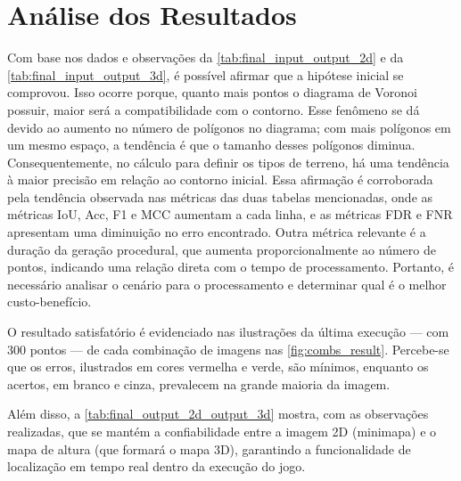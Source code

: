 \section{Análise dos Resultados}

Com base nos dados e observações da \cref{tab:final_input_output_2d} e da \cref{tab:final_input_output_3d}, é possível afirmar que a hipótese inicial se comprovou. Isso ocorre porque, quanto mais pontos o diagrama de Voronoi possuir, maior será a compatibilidade com o contorno. Esse fenômeno se dá devido ao aumento no número de polígonos no diagrama; com mais polígonos em um mesmo espaço, a tendência é que o tamanho desses polígonos diminua. Consequentemente, no cálculo para definir os tipos de terreno, há uma tendência à maior precisão em relação ao contorno inicial. Essa afirmação é corroborada pela tendência observada nas métricas das duas tabelas mencionadas, onde as métricas IoU, Acc, F1 e MCC aumentam a cada linha, e as métricas FDR e FNR apresentam uma diminuição no erro encontrado. Outra métrica relevante é a duração da geração procedural, que aumenta proporcionalmente ao número de pontos, indicando uma relação direta com o tempo de processamento. Portanto, é necessário analisar o cenário para o processamento e determinar qual é o melhor custo-benefício.

O resultado satisfatório é evidenciado nas ilustrações da última execução — com 300 pontos — de cada combinação de imagens nas \cref{fig:combs_result}. Percebe-se que os erros, ilustrados em cores vermelha e verde, são mínimos, enquanto os acertos, em branco e cinza, prevalecem na grande maioria da imagem.

Além disso, a \cref{tab:final_output_2d_output_3d} mostra, com as observações realizadas, que se mantém a confiabilidade entre a imagem 2D (minimapa) e o mapa de altura (que formará o mapa 3D), garantindo a funcionalidade de localização em tempo real dentro da execução do jogo.


